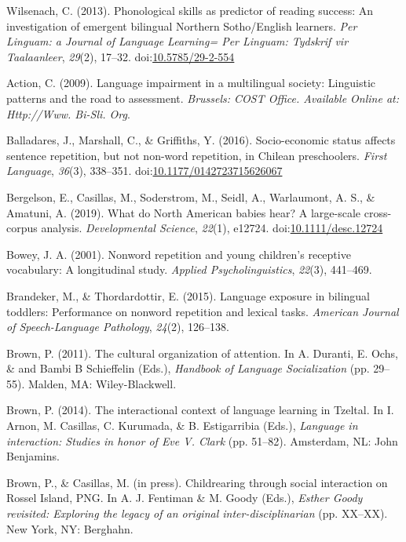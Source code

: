\documentclass[english,,man,floatsintext]{apa6}
\begin{document}
\hypertarget{ref-wilsenach2013phonological}{}
Wilsenach, C. (2013). Phonological skills as predictor of reading
success: An investigation of emergent bilingual Northern Sotho/English
learners. \emph{Per Linguam: a Journal of Language Learning= Per
Linguam: Tydskrif vir Taalaanleer}, \emph{29}(2), 17--32.
doi:\href{https://doi.org/10.5785/29-2-554}{10.5785/29-2-554}

\hypertarget{ref-is08042009language}{}
Action, C. (2009). Language impairment in a multilingual society:
Linguistic patterns and the road to assessment. \emph{Brussels: COST
Office. Available Online at: Http://Www. Bi-Sli. Org}.

\hypertarget{ref-balladares2016socio}{}
Balladares, J., Marshall, C., \& Griffiths, Y. (2016). Socio-economic
status affects sentence repetition, but not non-word repetition, in
Chilean preschoolers. \emph{First Language}, \emph{36}(3), 338--351.
doi:\href{https://doi.org/10.1177/0142723715626067}{10.1177/0142723715626067}

\hypertarget{ref-bergelsoncasillas2019what}{}
Bergelson, E., Casillas, M., Soderstrom, M., Seidl, A., Warlaumont, A.
S., \& Amatuni, A. (2019). What do North American babies hear? A
large-scale cross-corpus analysis. \emph{Developmental Science},
\emph{22}(1), e12724.
doi:\href{https://doi.org/10.1111/desc.12724}{10.1111/desc.12724}

\hypertarget{ref-bowey2001nonword}{}
Bowey, J. A. (2001). Nonword repetition and young children's receptive
vocabulary: A longitudinal study. \emph{Applied Psycholinguistics},
\emph{22}(3), 441--469.

\hypertarget{ref-brandeker2015language}{}
Brandeker, M., \& Thordardottir, E. (2015). Language exposure in
bilingual toddlers: Performance on nonword repetition and lexical tasks.
\emph{American Journal of Speech-Language Pathology}, \emph{24}(2),
126--138.

\hypertarget{ref-brown2011cultural}{}
Brown, P. (2011). The cultural organization of attention. In A. Duranti,
E. Ochs, \& and Bambi B Schieffelin (Eds.), \emph{Handbook of Language
Socialization} (pp. 29--55). Malden, MA: Wiley-Blackwell.

\hypertarget{ref-brown2014interactional}{}
Brown, P. (2014). The interactional context of language learning in
Tzeltal. In I. Arnon, M. Casillas, C. Kurumada, \& B. Estigarribia
(Eds.), \emph{Language in interaction: Studies in honor of Eve V. Clark}
(pp. 51--82). Amsterdam, NL: John Benjamins.

\hypertarget{ref-brownIPchildrearing}{}
Brown, P., \& Casillas, M. (in press). Childrearing through social
interaction on Rossel Island, PNG. In A. J. Fentiman \& M. Goody (Eds.),
\emph{Esther Goody revisited: Exploring the legacy of an original
inter-disciplinarian} (pp. XX--XX). New York, NY: Berghahn.
\end{document}
